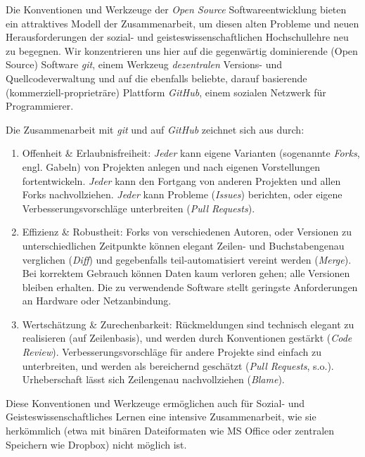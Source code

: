 \documentclass[11pt,a4paper,oneside]{article}
\begin{document}
Die Konventionen und Werkzeuge der \emph{Open Source} Softwareentwicklung bieten ein attraktives Modell der Zusammenarbeit, um diesen alten Probleme und neuen Herausforderungen der sozial- und geisteswissenschaftlichen Hochschullehre neu zu begegnen.
Wir konzentrieren uns hier auf die gegenwärtig dominierende  (Open Source) Software \emph{git}, einem Werkzeug \emph{dezentralen} Versions- und Quellcodeverwaltung und auf die ebenfalls beliebte, darauf basierende (kommerziell-proprieträre) Plattform \emph{GitHub}, einem sozialen Netzwerk für Programmierer.

Die Zusammenarbeit mit \emph{git} und auf \emph{GitHub} zeichnet sich aus durch:
\begin{enumerate}
	\item Offenheit & Erlaubnisfreiheit:
		\emph{Jeder} kann eigene Varianten (sogenannte \emph{Forks}, engl. Gabeln) von Projekten anlegen und nach eigenen Vorstellungen fortentwickeln.
		\emph{Jeder} kann den Fortgang von anderen Projekten und allen Forks nachvollziehen.
		\emph{Jeder} kann Probleme (\emph{Issues}) berichten, oder eigene Verbesserungsvorschläge unterbreiten (\emph{Pull Requests}).
	\item Effizienz & Robustheit:
		Forks von verschiedenen Autoren, oder Versionen zu unterschiedlichen Zeitpunkte können elegant Zeilen- und Buchstabengenau verglichen (\emph{Diff}) und gegebenfalls teil-automatisiert vereint werden (\emph{Merge}).
		Bei korrektem Gebrauch können Daten kaum verloren gehen; alle Versionen bleiben erhalten.
		Die zu verwendende Software stellt geringste Anforderungen an Hardware oder Netzanbindung.
	\item Wertschätzung & Zurechenbarkeit:
		Rückmeldungen sind technisch elegant zu realisieren (auf Zeilenbasis), und werden durch Konventionen gestärkt (\emph{Code Review}).
		Verbesserungsvorschläge für andere Projekte sind einfach zu unterbreiten, und werden als bereichernd geschätzt (\emph{Pull Requests}, s.o.).
		Urheberschaft lässt sich Zeilengenau nachvollziehen (\emph{Blame}).
\end{enumerate}

Diese Konventionen und Werkzeuge ermöglichen auch für Sozial- und Geisteswissenschaftliches Lernen eine intensive Zusammenarbeit, wie sie herkömmlich (etwa mit binären Dateiformaten wie MS Office oder zentralen Speichern wie Dropbox) nicht möglich ist.
\end{document}
